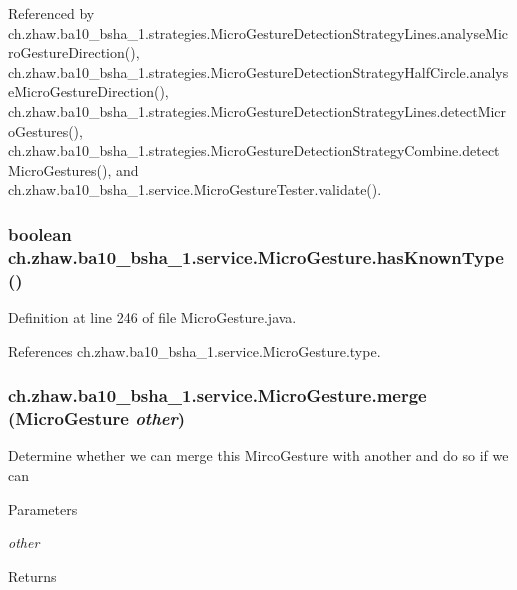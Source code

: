 Referenced by ch.zhaw.ba10\_\-bsha\_\-1.strategies.MicroGestureDetectionStrategyLines.analyseMicroGestureDirection(), ch.zhaw.ba10\_\-bsha\_\-1.strategies.MicroGestureDetectionStrategyHalfCircle.analyseMicroGestureDirection(), ch.zhaw.ba10\_\-bsha\_\-1.strategies.MicroGestureDetectionStrategyLines.detectMicroGestures(), ch.zhaw.ba10\_\-bsha\_\-1.strategies.MicroGestureDetectionStrategyCombine.detectMicroGestures(), and ch.zhaw.ba10\_\-bsha\_\-1.service.MicroGestureTester.validate().\hypertarget{classch_1_1zhaw_1_1ba10__bsha__1_1_1service_1_1MicroGesture_a85e524f74a8ae04db9418ddecb835bcd}{
\subsubsection[{hasKnownType}]{\setlength{\rightskip}{0pt plus 5cm}boolean ch.zhaw.ba10\_\-bsha\_\-1.service.MicroGesture.hasKnownType ()}}
\label{classch_1_1zhaw_1_1ba10__bsha__1_1_1service_1_1MicroGesture_a85e524f74a8ae04db9418ddecb835bcd}


Definition at line 246 of file MicroGesture.java.

References ch.zhaw.ba10\_\-bsha\_\-1.service.MicroGesture.type.\hypertarget{classch_1_1zhaw_1_1ba10__bsha__1_1_1service_1_1MicroGesture_a363ee314636824c156497dd7138edaa9}{
\subsubsection[{merge}]{ ch.zhaw.ba10\_\-bsha\_\-1.service.MicroGesture.merge ({\bf MicroGesture} {\em other})}}
\label{classch_1_1zhaw_1_1ba10__bsha__1_1_1service_1_1MicroGesture_a363ee314636824c156497dd7138edaa9}
Determine whether we can merge this MircoGesture with another and do so if we can


\begin{DoxyParams}{Parameters}
\item[{\em other}]\end{DoxyParams}
\begin{DoxyReturn}{Returns}

\end{DoxyReturn}


